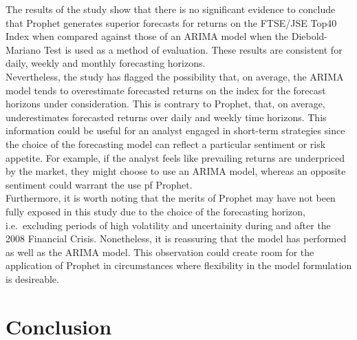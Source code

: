 \documentclass[12pt,a4paper]{article}
\numberwithin{equation}{section}
\numberwithin{figure}{section}
\numberwithin{table}{section}
\begin{document}
The results of the study show that there is no significant evidence to
conclude that Prophet generates superior forecasts for returns on the
FTSE/JSE Top40 Index when compared against those of an ARIMA model when
the Diebold-Mariano Test is used as a method of evaluation. These
results are consistent for daily, weekly and monthly forecasting
horizons.\\
Nevertheless, the study has flagged the possibility that, on average,
the ARIMA model tends to overestimate forecasted returns on the index
for the forecast horizons under consideration. This is contrary to
Prophet, that, on average, underestimates forecasted returns over daily
and weekly time horizons. This information could be useful for an
analyst engaged in short-term strategies since the choice of the
forecasting model can reflect a particular sentiment or risk appetite.
For example, if the analyst feels like prevailing returns are
underpriced by the market, they might choose to use an ARIMA model,
whereas an opposite sentiment could warrant the use pf Prophet.\\
Furthermore, it is worth noting that the merits of Prophet may have not
been fully exposed in this study due to the choice of the forecasting
horizon, i.e.~excluding periods of high volatility and uncertainity
during and after the 2008 Financial Crisis. Nonetheless, it is
reassuring that the model has performed as well as the ARIMA model. This
observation could create room for the application of Prophet in
circumstances where flexibility in the model formulation is desireable.

\section{Conclusion}\label{conclusion}
\end{document}
